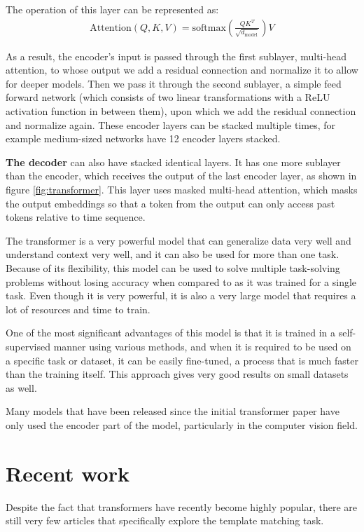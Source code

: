 \documentclass{report}[12pt, a4paper]
\begin{document}
The operation of this layer can be represented as:
\begin{align*}
    {\text{Attention}}(Q, K, V) = \text{softmax}\left(\frac{QK^{T}}{\sqrt{d_{\text{model}}}}\right)V
\end{align*}

As a result, the encoder's input is passed through the first sublayer, multi-head attention, to whose output we add a residual connection and normalize it to allow for deeper models. Then we pass it through the second sublayer, a simple feed forward network (which consists of two linear transformations with a ReLU activation function in between them), upon which we add the residual connection and normalize again. These encoder layers can be stacked multiple times, for example medium-sized networks have 12 encoder layers stacked.

\textbf{The decoder} can also have stacked identical layers. It has one more sublayer than the encoder, which receives the output of the last encoder layer, as shown in figure \ref{fig:transformer}.
This layer uses masked multi-head attention, which masks the output embeddings so that a token from the output can only access past tokens relative to time sequence.

The transformer is a very powerful model that can generalize data very well and understand context very well, and it can also be used for more than one task. Because of its flexibility, this model can be used to solve multiple task-solving problems without losing accuracy when compared to as it was trained for a single task. Even though it is very powerful, it is also a very large model that requires a lot of resources and time to train.

One of the most significant advantages of this model is that it is trained in a self-supervised manner using various methods, and when it is required to be used on a specific task or dataset, it can be easily fine-tuned, a process that is much faster than the training itself. This approach gives very good results on small datasets as well.

Many models that have been released since the initial transformer paper have only used the encoder part of the model, particularly in the computer vision field.

\chapter{Recent work}

Despite the fact that transformers have recently become highly popular, there are still very few articles that specifically explore the template matching task.
\end{document}

